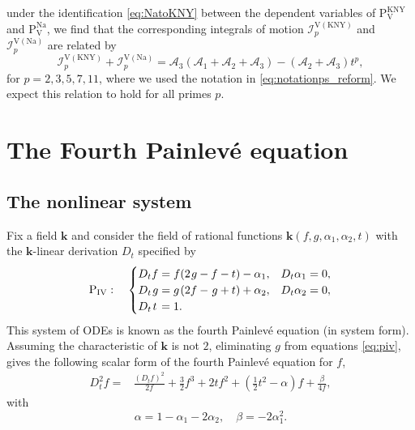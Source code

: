 \documentclass[a4paper,reqno]{amsart}
\numberwithin{equation}{section}
\numberwithin{figure}{section}
\theoremstyle{remark}
\newcommand\Pfour{\textrm{P}_{\textrm{IV}}}
\newcommand\Pfive{\textrm{P}_{\textrm{V}}}
\begin{document}
under the identification \eqref{eq:NatoKNY} between the dependent variables of $\Pfive^\text{KNY}$ and $\Pfive^\text{Na}$, we find that the corresponding integrals of motion $\mathcal{I}_p^{\textrm{V}(\text{KNY})}$ and $\mathcal{I}_p^{\textrm{V}(\text{Na})}$ are related by
\begin{equation*}
   \mathcal{I}_p^{\textrm{V}(\text{KNY})} +\mathcal{I}_p^{\textrm{V}(\text{Na})}=\mathcal{A}_3(\mathcal{A}_1+\mathcal{A}_2+\mathcal{A}_3)-(\mathcal{A}_2+\mathcal{A}_3)t^p,
\end{equation*}
for $p=2,3,5,7,11$, where we used the notation in \eqref{eq:notationps_reform}.
We expect this relation to hold for all primes $p$.










\section{The Fourth Painlev\'e equation}\label{sect:p4}
\subsection{The nonlinear system}
Fix a field $\mathbf{k}$ and consider the field of rational functions $\mathbf{k}(f,g,\alpha_1,\alpha_2,t)$ with the $\mathbf{k}$-linear derivation $D_t$ specified by
 \begin{equation}\label{eq:piv}
 \Pfour:\quad           \begin{cases}
        D_t f=f(2\hspace{0.3mm}g-f-t)-\alpha_1, &   D_t \alpha_1=0, \\
   D_t \hspace{0.3mm}g=g\hspace{0.3mm}(2f-\hspace{0.3mm}g+t)+\alpha_2, &   D_t \alpha_2=0, \\
        D_t \hspace{0.4mm}t\hspace{0.4mm}=1. & 
    \end{cases}
    \end{equation}
 This system of ODEs is known as the fourth Painlev\'e equation (in system form). Assuming the characteristic of $\mathbf{k}$ is not $2$, eliminating $g$ from equations \eqref{eq:piv}, gives the following scalar form of the fourth Painlev\'e equation for $f$,
\begin{align*}
    D_t^2f=&\frac{(D_tf)^2}{2f}+\frac{3}{2}f^3+2tf^2+(\tfrac{1}{2}t^2-\alpha)f+\frac{\beta}{4f},
\end{align*}
with
\begin{equation*}
    \alpha=1-\alpha_1-2\alpha_2,\quad \beta=-2\alpha_1^2.
\end{equation*}
\end{document}
